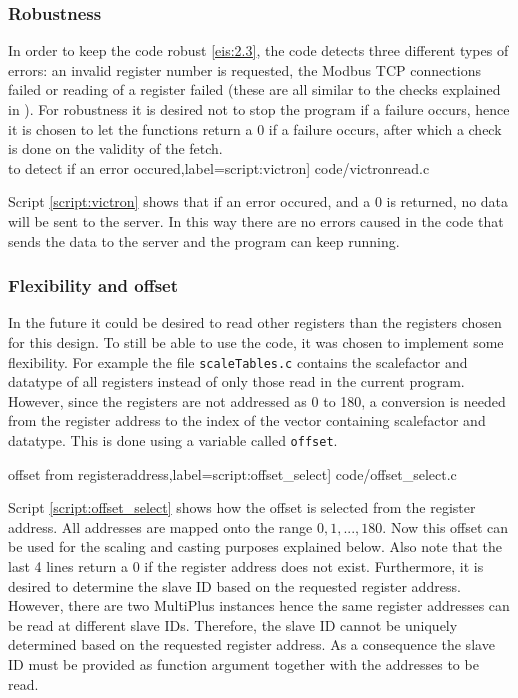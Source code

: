 \subsubsection{Robustness}
In order to keep the code robust \ref{eis:2.3}, the code detects three different types of errors: an invalid register number is requested, the Modbus TCP connections failed or reading of a register failed (these are all similar to the checks explained in ). For robustness it is desired not to stop the program if a failure occurs, hence it is chosen to let the functions return a 0 if a failure occurs, after which a check is done on the validity of the fetch.\\

\scriptsize
	 to detect if an error occured,label=script:victron] {code/victronread.c}
\normalsize

Script \ref{script:victron} shows that if an error occured, and a 0 is returned, no data will be sent to the server. In this way there are no errors caused in the code that sends the data to the server and the program can keep running.\\

\subsubsection{Flexibility and offset}\label{sec:offset}
In the future it could be desired to read other registers than the registers chosen for this design. To still be able to use the code, it was chosen to implement some flexibility. For example the file \verb|scaleTables.c| contains the scalefactor and datatype of all registers instead of only those read in the current program. However, since the registers are not addressed as 0 to 180, a conversion is needed from the register address to the index of the vector containing scalefactor and datatype. This is done using a variable called \verb|offset|.

\scriptsize
	 offset from registeraddress,label=script:offset_select] {code/offset_select.c}
\normalsize

Script \ref{script:offset_select} shows how the offset is selected from the register address. All addresses are mapped onto the range ${0,1,...,180}$. Now this offset can be used for the scaling and casting purposes explained below. Also note that the last 4 lines return a 0 if the register address does not exist. Furthermore, it is desired to determine the slave ID based on the requested register address. However, there are two MultiPlus instances hence the same register addresses can be read at different slave IDs. Therefore, the slave ID cannot be uniquely determined based on the requested register address. As a consequence the slave ID must be provided as function argument together with the addresses to be read.\\


